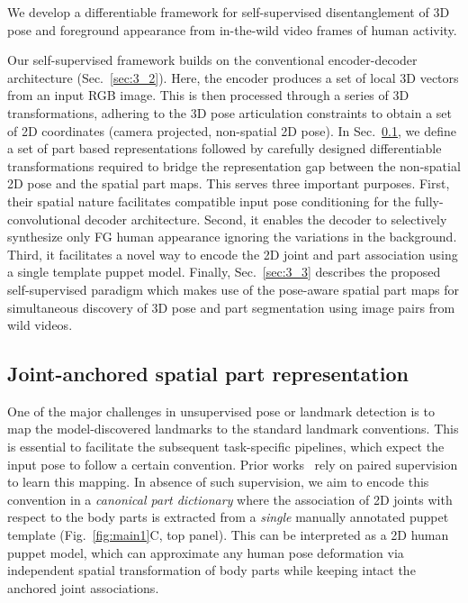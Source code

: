 



We develop a differentiable framework for self-supervised disentanglement of 3D pose and foreground appearance from in-the-wild video frames of human activity.







Our self-supervised 
framework builds on the conventional encoder-decoder architecture (Sec.~\ref{sec:3_2}). Here, the encoder produces a set of local 3D vectors from an input RGB image. This is then processed through a series of 3D transformations, adhering to the 3D pose articulation constraints to obtain a set of 2D coordinates (camera projected, non-spatial 2D pose). 
In Sec.~\ref{sec:3_1}, we define a set of part based representations followed by carefully designed differentiable transformations required to bridge the representation gap between the non-spatial 2D pose and the spatial part maps. This serves three important purposes. First, their spatial nature facilitates compatible input pose conditioning for the fully-convolutional decoder architecture. Second, it enables the decoder to selectively synthesize only FG human appearance ignoring the variations in the background. 
Third, it facilitates a novel way to encode the 2D joint and part association using a single template puppet model. 
Finally, Sec.~\ref{sec:3_3} describes the proposed self-supervised paradigm which makes use of the pose-aware spatial part maps for simultaneous discovery of 3D pose and part segmentation using image pairs from wild videos.
















\subsection{Joint-anchored spatial part representation}\label{sec:3_1}
One of the major challenges in unsupervised pose or landmark detection is to map the model-discovered landmarks to the standard landmark conventions. This is essential to facilitate the 
subsequent task-specific pipelines, which expect the input pose to follow a certain convention. Prior works~\cite{rhodin2018unsupervised,kundu2020ksp} rely on paired supervision to learn this mapping. In absence of such supervision, we aim to encode this convention in a \textit{canonical part dictionary} where the association of 2D joints with respect to the body parts is extracted from a \textit{single} manually annotated puppet template (Fig.~\ref{fig:main1}{\color{red}C}, top panel). This can be interpreted as a 2D human puppet model, which can approximate any human pose deformation via independent spatial transformation of body parts while keeping intact the anchored joint associations.

